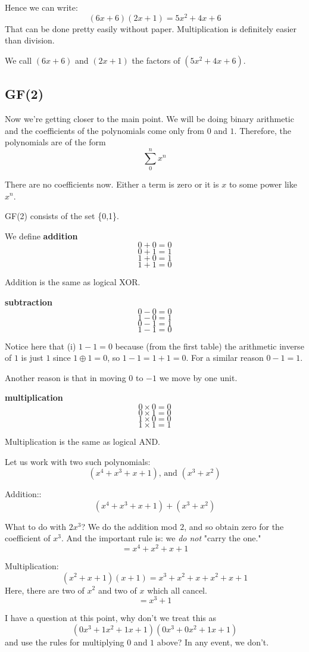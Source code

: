 \documentclass[11pt, oneside]{article}
\begin{document}
Hence we can write:
\[ (6x + 6)(2x + 1) = 5x^2 + 4x + 6 \]
That can be done pretty easily without paper.  Multiplication is definitely easier than division.

We call $(6x + 6)$ and $(2x + 1)$ the factors of $(5x^2 + 4x + 6)$.

\subsection*{GF(2)}

Now we're getting closer to the main point.  We will be doing binary arithmetic and the coefficients of the polynomials come only from $0$ and $1$.  Therefore, the polynomials are of the form
\[ \sum_0^n x^n \] 

There are no coefficients now.  Either a term is zero or it is $x$ to some power like $x^n$.

GF(2) consists of the set \{0,1\}.

We define \textbf{addition}
\[ 0 + 0 = 0 \]
\[ 0 + 1 = 1 \]
\[ 1 + 0 = 1 \]
\[ 1 + 1 = 0 \]

Addition is the same as logical XOR.

\textbf{subtraction}
\[ 0 - 0 = 0 \]
\[ 1 - 0 = 1 \] 
\[ 0 - 1 = 1 \]
\[ 1 - 1 = 0 \]

Notice here that (i) $1 - 1 = 0$ because (from the first table) the arithmetic inverse of $1$ is just $1$ since $1 \oplus 1 = 0$, so $1 - 1 = 1 + 1 = 0$.  For a similar reason $0 - 1 = 1$.

Another reason is that in moving  $0$ to $-1$ we move by one unit.

\textbf{multiplication}
\[ 0 \times 0 = 0 \]
\[ 0 \times 1 = 0 \]
\[ 1 \times 0 = 0 \]
\[ 1 \times 1 = 1 \]

Multiplication is the same as logical AND.

Let us work with two such polynomials:  
\[ (x^4 + x^3 + x + 1) \text{, and } (x^3 + x^2)  \]

Addition::
\[ (x^4 + x^3 + x + 1) + (x^3 + x^2)  \]

What to do with $2x^3$?  We do the addition mod $2$, and so obtain zero for the coefficient of $x^3$.  And the important rule is:  we \emph{do not} "carry the one."
\[ = x^4 + x^2 + x + 1 \]

Multiplication:
\[ (x^2 + x + 1)(x + 1) = x^3 + x^2 + x + x^2 + x + 1 \]
Here, there are two of $x^2$ and two of $x$ which all cancel.
\[ = x^3 + 1 \]

I have a question at this point, why don't we treat this as
\[ (0x^3 + 1x^2 + 1x + 1)(0x^3 + 0x^2 + 1x + 1) \]
and use the rules for multiplying $0$ and $1$ above?  In any event, we don't.
\end{document}
